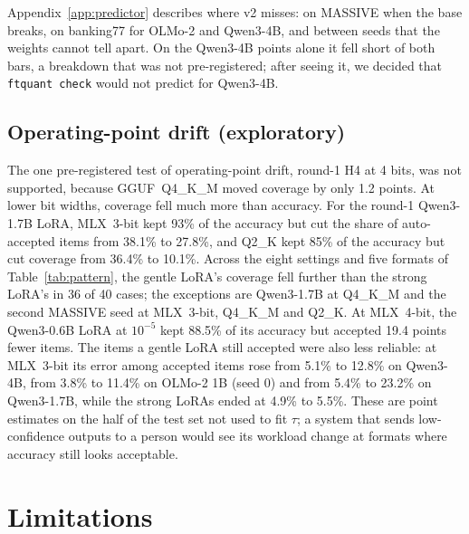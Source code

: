 \documentclass[10pt]{article}
\begin{document}
Appendix~\ref{app:predictor} describes where v2 misses: on MASSIVE when the base breaks, on banking77 for OLMo-2 and Qwen3-4B, and between seeds that the weights cannot tell apart. On the Qwen3-4B points alone it fell short of both bars, a breakdown that was not pre-registered; after seeing it, we decided that \texttt{ftquant check} would not predict for Qwen3-4B.

\subsection{Operating-point drift (exploratory)}
\label{sec:drift}

The one pre-registered test of operating-point drift, round-1 H4 at 4 bits, was not supported, because GGUF~Q4\_K\_M moved coverage by only 1.2 points. At lower bit widths, coverage fell much more than accuracy. For the round-1 Qwen3-1.7B LoRA, MLX~3-bit kept 93\% of the accuracy but cut the share of auto-accepted items from 38.1\% to 27.8\%, and Q2\_K kept 85\% of the accuracy but cut coverage from 36.4\% to 10.1\%. Across the eight settings and five formats of Table~\ref{tab:pattern}, the gentle LoRA's coverage fell further than the strong LoRA's in 36 of 40 cases; the exceptions are Qwen3-1.7B at Q4\_K\_M and the second MASSIVE seed at MLX~3-bit, Q4\_K\_M and Q2\_K. At MLX~4-bit, the Qwen3-0.6B LoRA at $10^{-5}$ kept 88.5\% of its accuracy but accepted 19.4 points fewer items. The items a gentle LoRA still accepted were also less reliable: at MLX~3-bit its error among accepted items rose from 5.1\% to 12.8\% on Qwen3-4B, from 3.8\% to 11.4\% on OLMo-2 1B (seed 0) and from 5.4\% to 23.2\% on Qwen3-1.7B, while the strong LoRAs ended at 4.9\% to 5.5\%. These are point estimates on the half of the test set not used to fit $\tau$; a system that sends low-confidence outputs to a person would see its workload change at formats where accuracy still looks acceptable.

\section{Limitations}
\label{sec:limits}
\end{document}
